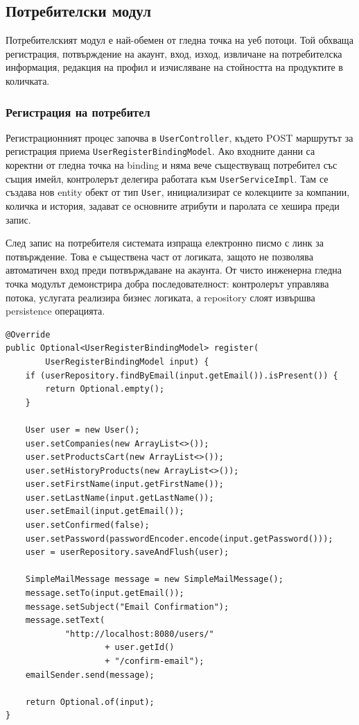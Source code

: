 \subsection{Потребителски модул}

Потребителският модул е най-обемен от гледна точка на уеб потоци. Той обхваща регистрация, потвърждение на акаунт, вход, изход, извличане на потребителска информация, редакция на профил и изчисляване на стойността на продуктите в количката.

\subsubsection{Регистрация на потребител}

Регистрационният процес започва в \texttt{UserController}, където POST маршрутът за регистрация приема \texttt{UserRegisterBindingModel}. Ако входните данни са коректни от гледна точка на binding и няма вече съществуващ потребител със същия имейл, контролерът делегира работата към \texttt{UserServiceImpl}. Там се създава нов entity обект от тип \texttt{User}, инициализират се колекциите за компании, количка и история, задават се основните атрибути и паролата се хешира преди запис.

След запис на потребителя системата изпраща електронно писмо с линк за потвърждение. Това е съществена част от логиката, защото не позволява автоматичен вход преди потвърждаване на акаунта. От чисто инженерна гледна точка модулът демонстрира добра последователност: контролерът управлява потока, услугата реализира бизнес логиката, а repository слоят извършва persistence операцията.

\begin{lstlisting}[caption={Опростен вид на регистрационната логика},label={lst:user-register}]
@Override
public Optional<UserRegisterBindingModel> register(
        UserRegisterBindingModel input) {
    if (userRepository.findByEmail(input.getEmail()).isPresent()) {
        return Optional.empty();
    }

    User user = new User();
    user.setCompanies(new ArrayList<>());
    user.setProductsCart(new ArrayList<>());
    user.setHistoryProducts(new ArrayList<>());
    user.setFirstName(input.getFirstName());
    user.setLastName(input.getLastName());
    user.setEmail(input.getEmail());
    user.setConfirmed(false);
    user.setPassword(passwordEncoder.encode(input.getPassword()));
    user = userRepository.saveAndFlush(user);

    SimpleMailMessage message = new SimpleMailMessage();
    message.setTo(input.getEmail());
    message.setSubject("Email Confirmation");
    message.setText(
            "http://localhost:8080/users/"
                    + user.getId()
                    + "/confirm-email");
    emailSender.send(message);

    return Optional.of(input);
}
\end{lstlisting}


